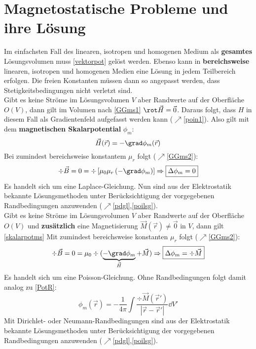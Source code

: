  \section{Magnetostatische Probleme und ihre Lösung}\label{magstatlsg}
	    Im einfachsten Fall des linearen, isotropen und homogenen Medium als \textbf{gesamtes} Lösungsvolumen muss \ref{vektorpot} gelöst werden. Ebenso kann in \textbf{bereichsweise} linearen, isotropen und homogenen Medien eine Lösung in jedem Teilbereich erfolgen. Die freien Konstanten müssen dann so angepasst werden, dass Stetigkeitsbedingungen nicht verletzt sind.\\
	   Gibt es keine Ströme im Lösungsvolumen $V$ aber Randwerte auf der Oberfläche $O(V)$, dann gilt im Volumen nach \ref{GGms1} $\rot \vec{H}  = \vec{0}$. Daraus folgt, dass $H$ in diesem Fall als Gradientenfeld aufgefasst werden kann ($\nearrow$\ref{poin1}). Also gilt mit dem \textbf{magnetischen Skalarpotential} $\phi_m$:
		              \begin{equation} \label{skalarpotms}
			              \vec{H} (\vec{r} ) = -\grad \phi_m (\vec{r} ) 
		              \end{equation}
		    Bei zumindest bereichsweise konstantem $\mu_r$ folgt ($\nearrow$\ref{GGms2}):
		              \begin{equation}
			              \div \vec{B}  = 0 = \div \left[\mu_0\mu_r \left(-\grad \phi_m \right)\right] \Rightarrow \boxed{\Delta \phi_m = 0}
		              \end{equation}
		         Es handelt sich um eine Laplace-Gleichung. Nun sind aus der Elektrostatik bekannte Lösungsmethoden unter Berücksichtigung der vorgegebenen Randbedingungen anzuwenden ($\nearrow$\ref{pdgl},\ref{poilsg}).\\
	   Gibt es keine Ströme im Lösungsvolumen $V$ aber Randwerte auf der Oberfläche $O(V)$ und \textbf{zusätzlich} eine Magnetisierung $\vec{M}(\vec{r} )\ne \vec{0}$ in $V$, dann gilt \ref{skalarpotms}
		         Mit zumindest bereichsweise konstanten $\mu_r$ folgt ($\nearrow$\ref{GGms2}):
		              \begin{equation}
			              \div \vec{B}  = 0 = \mu_0\div ( \underbrace{-\grad \phi_m }_{\vec{H} }+\vec{M}) \Rightarrow \boxed{\Delta \phi_m = \div \vec{M}} 
		              \end{equation}
		         Es handelt sich um eine Poisson-Gleichung. Ohne Randbedingungen folgt damit analog zu \ref{PotR}:
		              \begin{equation}
			              \phi_m (\vec{r} ) = -\frac{1}{4\pi} \int \frac{\div \vec{M} (\vec{r}' ) }{|\vec{r} -\vec{r}' |} \dd V'
		              \end{equation}
		         Mit Dirichlet- oder Neumann-Randbedingungen sind aus der Elektrostatik bekannte Lösungsmethoden unter Berücksichtigung der vorgegebenen Randbedingungen anzuwenden ($\nearrow$\ref{pdgl},\ref{poilsg}).

